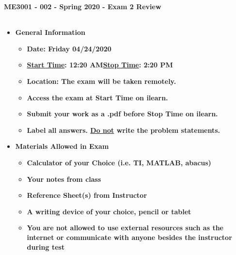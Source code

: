\documentclass[11pt]{article}
\begin{document}
\textbf{ \LARGE ME3001 - 002 - Spring 2020 - Exam 2 Review  } \\\\

\large
\begin{itemize}
	\item  \textbf{\Large General Information}\\

	\begin{itemize}

		\item  \textbf{Date: Friday 04/24/2020 }\\
		\item  \textbf{\underline{Start Time}: 12:20 AM\hspace{5mm}\underline{Stop Time}: 2:20 PM}\\
		\item  \textbf{Location: The exam will be taken remotely. }\\
		\item  \textbf{Access the exam at Start Time on ilearn.} \\
		\item  \textbf{Submit your work as a .pdf before Stop Time on ilearn.}\\ 
		\item  \textbf{Label all answers. \underline{Do not} write the problem statements.}\\
	\end{itemize}

		\item  \textbf{\Large Materials Allowed in Exam}\\

	\begin{itemize}

		\item  \textbf{Calculator of your Choice (i.e. TI, MATLAB, abacus)}\\
		\item  \textbf{Your notes from class}\\
		\item  \textbf{Reference Sheet(s) from Instructor}\\
		\item  \textbf{A writing device of your choice, pencil or tablet}\\
		\item  \textbf{You are not allowed to use external resources such as the \\internet or communicate with anyone besides the instructor during test}\\


\end{itemize}
\end{itemize}
\end{document}
